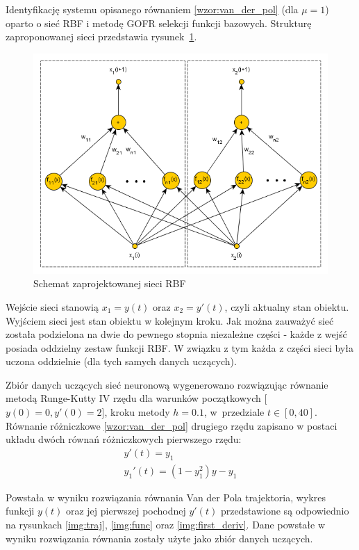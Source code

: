 Identyfikację systemu opisanego równaniem \ref{wzor:van_der_pol} (dla $\mu = 1$) oparto o sieć RBF i metodę GOFR selekcji funkcji bazowych. Strukturę zaproponowanej sieci przedstawia rysunek~\ref{fig:rbf}.
\begin{figure}[ht!]
	\centering
	
	\includegraphics[width = \textwidth]{images/rbf.png}
	\caption{Schemat zaprojektowanej sieci RBF}
	\label{fig:rbf}	

\end{figure}
Wejście sieci stanowią $x_1 = y(t)$ oraz $x_2 = y'(t)$, czyli aktualny stan obiektu. Wyjściem sieci jest stan obiektu w kolejnym kroku. Jak można zauważyć sieć została podzielona na dwie do pewnego stopnia niezależne części - każde z wejść posiada oddzielny zestaw funkcji RBF. W związku z tym każda z części sieci była uczona oddzielnie (dla tych samych danych uczących). 

Zbiór danych uczących sieć neuronową wygenerowano rozwiązując równanie metodą Runge-Kutty IV rzędu dla warunków początkowych [$y(0)=0,y'(0)=2$], kroku metody $h=0.1$, w~przedziale $t \in [0,40]$. Równanie różniczkowe \ref{wzor:van_der_pol} drugiego rzędu zapisano w postaci układu dwóch równań różniczkowych pierwszego rzędu:
\begin{equation}
	\begin{array}{l}
    y'(t)  = y_1 \\
    y_1'(t) = (1-y_1^2)y-y_1
    \end{array}
\end{equation}

Powstała w wyniku rozwiązania równania Van der Pola trajektoria, wykres funkcji $y(t)$ oraz jej pierwszej pochodnej $y'(t)$ przedstawione są odpowiednio na rysunkach \ref{img:traj}, \ref{img:func} oraz \ref{img:first_deriv}. Dane powstałe w wyniku rozwiązania równania zostały użyte jako zbiór danych uczących.

